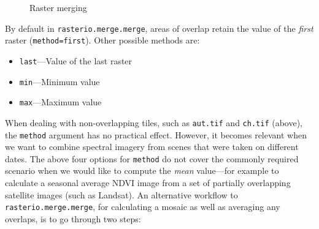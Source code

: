 \documentclass[
  letterpaper,
]{krantz}
\providecommand{\tightlist}{%
  \setlength{\itemsep}{0pt}\setlength{\parskip}{0pt}}\usepackage{longtable,booktabs,array}
\begin{document}
\begin{figure}

\begin{minipage}{0.33\linewidth}



\end{minipage}%
%
\begin{minipage}{0.33\linewidth}



\end{minipage}%
%
\begin{minipage}{0.33\linewidth}



\end{minipage}%

\caption{\label{fig-raster-merge}Raster merging}

\end{figure}%

By default in \texttt{rasterio.merge.merge}, areas of overlap retain the
value of the \emph{first} raster
(\texttt{method=\textquotesingle{}first\textquotesingle{}}). Other
possible methods are:

\begin{itemize}
\tightlist
\item
  \texttt{\textquotesingle{}last\textquotesingle{}}---Value of the last
  raster
\item
  \texttt{\textquotesingle{}min\textquotesingle{}}---Minimum value
\item
  \texttt{\textquotesingle{}max\textquotesingle{}}---Maximum value
\end{itemize}

When dealing with non-overlapping tiles, such as \texttt{aut.tif} and
\texttt{ch.tif} (above), the \texttt{method} argument has no practical
effect. However, it becomes relevant when we want to combine spectral
imagery from scenes that were taken on different dates. The above four
options for \texttt{method} do not cover the commonly required scenario
when we would like to compute the \emph{mean} value---for example to
calculate a seasonal average NDVI image from a set of partially
overlapping satellite images (such as Landsat). An alternative workflow
to \texttt{rasterio.merge.merge}, for calculating a mosaic as well as
averaging any overlaps, is to go through two steps:
\end{document}
